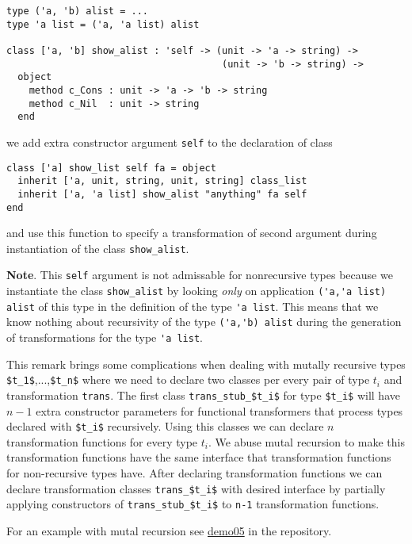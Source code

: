 \documentclass[acmsmall,review,anonymous]{acmart}\settopmatter{printfolios=true,printccs=false,printacmref=false}
\begin{document}
\begin{lstlisting}
type ('a, 'b) alist = ...
type 'a list = ('a, 'a list) alist

class ['a, 'b] show_alist : 'self -> (unit -> 'a -> string) ->
                                      (unit -> 'b -> string) ->
  object
    method c_Cons : unit -> 'a -> 'b -> string
    method c_Nil  : unit -> string
  end
\end{lstlisting}

we add extra constructor argument \lstinline{self} to the declaration of class
\begin{lstlisting}
class ['a] show_list self fa = object
  inherit ['a, unit, string, unit, string] class_list
  inherit ['a, 'a list] show_alist "anything" fa self
end
\end{lstlisting}
and use this function to specify a transformation of second argument during instantiation of the class \lstinline{show_alist}.

\textbf{Note}. This \lstinline{self} argument is not admissable for nonrecursive types because we instantiate the class \lstinline{show_alist} by looking \textit{only} on application \lstinline{('a,'a list) alist} of this type in the definition of the type \lstinline{'a list}. This means that we know nothing about recursivity of the type \lstinline{('a,'b) alist} during the generation of transformations for the type \lstinline{'a list}.

This remark brings some complications when dealing with mutally recursive types \lstinline{$t_1$},...,\lstinline{$t_n$} where we need to declare two classes per every pair of type $t_i$ and transformation \lstinline{trans}. The first class \lstinline{trans_stub_$t_i$} for type \lstinline{$t_i$} will have $n-1$ extra constructor parameters for functional transformers that process types declared with \lstinline{$t_i$} recursively. Using this classes we can declare $n$ transformation functions for every type $t_i$. We abuse mutal recursion to make this transformation functions have the same interface that transformation functions for non-recursive types have. After declaring transformation functions we can declare transformation classes \lstinline{trans_$t_i$} with desired interface by partially applying constructors of \lstinline{trans_stub_$t_i$} to \lstinline{n-1} transformation functions.
  
For an example with mutal recursion see \href{https://github.com/Kakadu/gt-demo/blob/master/src/demo05mutal.ml}{demo05} in the repository.
\end{document}
